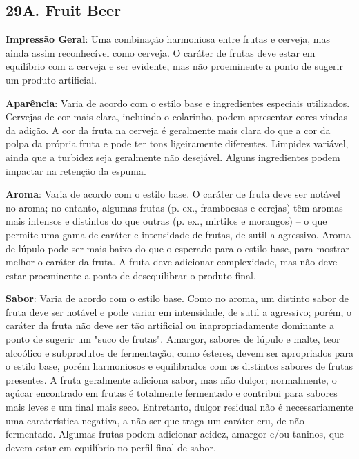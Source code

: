 \subsection*{29A. Fruit Beer}

\textbf{Impressão Geral}: Uma combinação harmoniosa entre frutas e cerveja, mas ainda assim reconhecível como cerveja. O caráter de frutas deve estar em equilíbrio com a cerveja e ser evidente, mas não proeminente a ponto de sugerir um produto artificial.

\textbf{Aparência}: Varia de acordo com o estilo base e ingredientes especiais utilizados. Cervejas de cor mais clara, incluindo o colarinho, podem apresentar cores vindas da adição. A cor da fruta na cerveja é geralmente mais clara do que a cor da polpa da própria fruta e pode ter tons ligeiramente diferentes. Limpidez variável, ainda que a turbidez seja geralmente não desejável. Alguns ingredientes podem impactar na retenção da espuma.

\textbf{Aroma}: Varia de acordo com o estilo base. O caráter de fruta deve ser notável no aroma; no entanto, algumas frutas (p. ex., framboesas e cerejas) têm aromas mais intensos e distintos do que outras (p. ex., mirtilos e morangos) – o que permite uma gama de caráter e intensidade de frutas, de sutil a agressivo. Aroma de lúpulo pode ser mais baixo do que o esperado para o estilo base, para mostrar melhor o caráter da fruta. A fruta deve adicionar complexidade, mas não deve estar proeminente a ponto de desequilibrar o produto final.

\textbf{Sabor}: Varia de acordo com o estilo base. Como no aroma, um distinto sabor de fruta deve ser notável e pode variar em intensidade, de sutil a agressivo; porém, o caráter da fruta não deve ser tão artificial ou inapropriadamente dominante a ponto de sugerir um "suco de frutas". Amargor, sabores de lúpulo e malte, teor alcoólico e subprodutos de fermentação, como ésteres, devem ser apropriados para o estilo base, porém harmoniosos e equilibrados com os distintos sabores de frutas presentes. A fruta geralmente adiciona sabor, mas não dulçor; normalmente, o açúcar encontrado em frutas é totalmente fermentado e contribui para sabores mais leves e um final mais seco. Entretanto, dulçor residual não é necessariamente uma caraterística negativa, a não ser que traga um caráter cru, de não fermentado. Algumas frutas podem adicionar acidez, amargor e/ou taninos, que devem estar em equilíbrio no perfil final de sabor.

